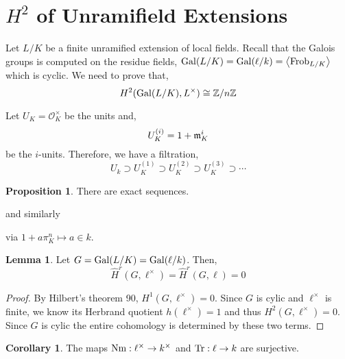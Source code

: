 \documentclass[12pt]{extarticle}
\newcommand{\Z}{\mathbb{Z}}
\newcommand{\ints}[1]{\mathcal{O}_{#1}}
\theoremstyle{definition}
\newtheorem{lemma}[theorem]{Lemma}
\newtheorem{proposition}[theorem]{Proposition}
\newtheorem{corollary}[theorem]{Corollary}
\newenvironment{definition}[1][Definition:]{\begin{trivlist}
\item[\hskip \labelsep {\bfseries #1}]}{\end{trivlist}}
\begin{document}
\section{$H^2$ of Unramifield Extensions}

Let $L / K$ be a finite unramified extension of local fields. Recall that the Galois groups is computed on the residue fields,
$\mathrm{Gal} (L / K) = \mathrm{Gal} (\ell / k) = \left< \mathrm{Frob}_{L/K} \right>$ which is cyclic. We need to prove that,
\[ H^2(\Gal{L/K}, L^\times) \cong \Z / n \Z \]

\begin{definition}
Let $U_K = \ints{K}^\times$ be the units and,
\[ U_K^{(i)} = 1 + \mathfrak{m}_K^i \]
be the $i$-units. Therefore, we have a filtration,
\[ U_k \supset U_K^{(1)} \supset U_K^{(2)} \supset U^{(3)}_K \supset \cdots \]
\end{definition}

\begin{proposition}
There are exact sequences.
\begin{center}
\end{center}
and similarly
\begin{center}
\end{center}
via $1 + a \pi_K^n \mapsto a \in k$. 
\end{proposition}

\begin{lemma}
Let $G = \mathrm{Gal} (L/K) = \mathrm{Gal} (\ell / k)$. Then,
\[ \hat{H}^r(G, \ell^\times) = \hat{H}^r(G, \ell) = 0 \]
\end{lemma}

\begin{proof}
By Hilbert's theorem 90, $H^1(G, \ell^\times) = 0$. Since $G$ is cylic and $\ell^\times$ is finite, we know its Herbrand quotient $h(\ell^\times) = 1$ and thus $H^2(G, \ell^\times) = 0$. Since $G$ is cylic the entire cohomology is determined by these two terms. 
\end{proof}

\begin{corollary}
The maps $\mathrm{Nm} : \ell^\times \to k^\times$ and $\mathrm{Tr} : \ell \to k$ are surjective. 
\end{corollary}
\end{document}
